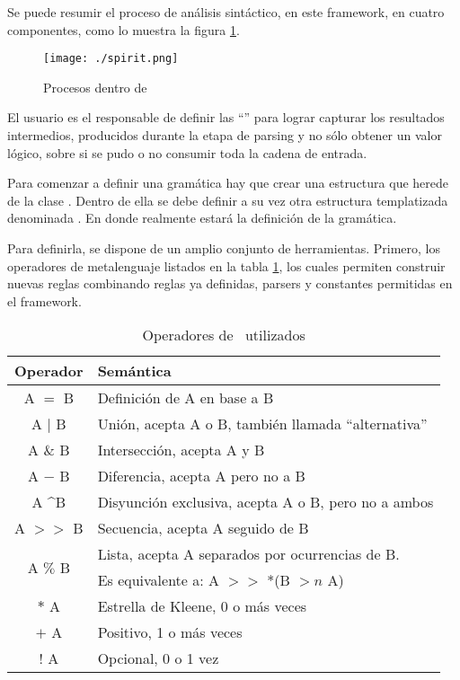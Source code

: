 Se puede resumir el proceso de análisis sintáctico, en este framework, en cuatro componentes, como lo muestra la figura \ref{fig:procesoSpirit}.

\begin{figure}[!ht]\centering
\texttt{[image: ./spirit.png]}
\caption{Procesos dentro de \spirit}\label{fig:procesoSpirit}
\end{figure}

El usuario es el responsable de definir las ``'' para lograr capturar los resultados intermedios, producidos durante la etapa de parsing y no sólo obtener un valor lógico, sobre si se pudo o no consumir toda la cadena de entrada.

Para comenzar a definir una gramática hay que crear una estructura que herede de la clase . Dentro de ella se debe definir a su vez otra estructura templatizada denominada . En donde realmente estará la definición de la gramática.

Para definirla, se dispone de un amplio conjunto de herramientas. Primero, los operadores de metalenguaje listados en la tabla \ref{ope_spirit}, los cuales permiten construir nuevas reglas combinando reglas ya definidas, parsers y constantes permitidas en el framework.

\begin{table}[!ht]\centering\scriptsize
\begin{tabular}{| c | p{7cm} |}
\hline

\rowcolor{gris} \textbf{Operador} & \textbf{Semántica} \\ \hline

A $=$                  B  & Definición de A en base a B \\ \hline
A $|$                  B  & Unión, acepta A o B, también llamada ``alternativa''\\ \hline
A $\&$                 B  & Intersección, acepta A y B \\ \hline
A $-$                  B  & Diferencia, acepta A pero no a B  \\ \hline
A \textasciicircum     B  & Disyunción exclusiva, acepta A o B, pero no a ambos \\ \hline
A $>>$                 B  & Secuencia, acepta A seguido de B \\ \hline
\multirow{2}{*}{A $\%$ B} & Lista, acepta A separados por ocurrencias de B.\\
                          & Es equivalente a: A $>>$ *(B $>n$ A)\\ \hline
$*$                    A  & Estrella de Kleene, 0 o más veces \\ \hline
$+$                    A  & Positivo, 1 o más veces \\ \hline
$!$                    A  & Opcional, 0 o 1 vez \\ \hline
\end{tabular}
\caption{Operadores de \spirit\ utilizados}\label{ope_spirit}
\end{table}

